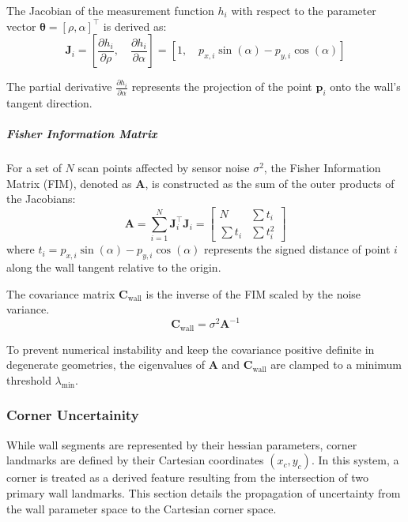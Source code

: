 \documentclass[11pt]{article}
\begin{document}
The Jacobian of the measurement function $h_i$ with respect to the parameter vector $\mathbf{\theta} = [\rho, \alpha]^\top$ is derived as:
\begin{equation}
	\mathbf{J}_i = \left[ \frac{\partial h_i}{\partial \rho}, \quad \frac{\partial h_i}{\partial \alpha} \right] = \left[ 1, \quad p_{x,i} \sin(\alpha) - p_{y,i} \cos(\alpha) \right]
\end{equation}



The partial derivative $\frac{\partial h_i}{\partial \alpha}$ represents the projection of the point $\mathbf{p}_i$ onto the wall's tangent direction.

\subparagraph{Fisher Information Matrix}
For a set of $N$ scan points affected by sensor noise $\sigma^2$, the Fisher Information Matrix (FIM), denoted as $\mathbf{A}$, is constructed as the sum of the outer products of the Jacobians:
\begin{equation}
	\mathbf{A} = \sum_{i=1}^N \mathbf{J}_i^\top \mathbf{J}_i = \begin{bmatrix} 
		N & \sum t_i \\ 
		\sum t_i & \sum t_i^2 
	\end{bmatrix}
\end{equation}
where $t_i = p_{x,i} \sin(\alpha) - p_{y,i} \cos(\alpha)$ represents the signed distance of point $i$ along the wall tangent relative to the origin.

The covariance matrix $\mathbf{C}_{\text{wall}}$ is the inverse of the FIM scaled by the noise variance. 
\begin{equation}
	\mathbf{C}_{\text{wall}} = \sigma^2 \mathbf{A}^{-1}
\end{equation}

To prevent numerical instability and keep the covariance positive definite in degenerate geometries, the eigenvalues of $\mathbf{A}$ and $\mathbf{C}_{\text{wall}}$ are clamped to a minimum threshold $\lambda_{\text{min}}$.


\subsubsection{Corner Uncertainity}

While wall segments are represented by their hessian parameters, corner landmarks are defined by their Cartesian coordinates $(x_c, y_c)$. In this system, a corner is treated as a derived feature resulting from the intersection of two primary wall landmarks. This section details the propagation of uncertainty from the wall parameter space to the Cartesian corner space.
\end{document}
